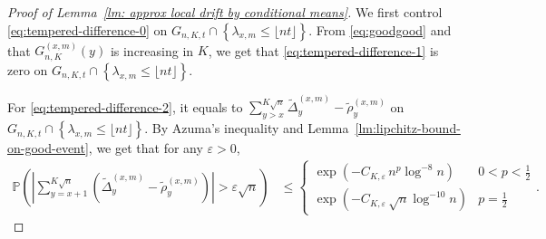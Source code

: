 \documentclass[EJP]{ejpecp} %
\begin{document}
\begin{proof}[Proof of Lemma~\ref{lm: approx local drift by conditional means}]
	We first control \eqref{eq:tempered-difference-0} on $G_{n, K, t} \cap \left\{\lambda_{x,m} \leq\lfloor nt \rfloor \right\}$. From \eqref{eq:goodgood} and that $G_{n,K}^{(x,m)}(y)$ is increasing in $K$, we get that  \eqref{eq:tempered-difference-1} is zero on $G_{n, K, t} \cap \left\{\lambda_{x,m} \leq\lfloor nt \rfloor \right\}$. 
	
	For \eqref{eq:tempered-difference-2}, it equals to
	$
	\sum_{y > x}^{K\sqrt{n}} \tilde \Delta_{y}^{(x,m)} - \tilde\rho_y^{(x,m)}
	$
	on $G_{n, K, t} \cap \left\{\lambda_{x,m} \leq\lfloor nt \rfloor \right\}$. By Azuma's inequality and Lemma~\ref{lm:lipchitz-bound-on-good-event}, we get that for any $\varepsilon>0$,
	\begin{align}
		\mathbb{P}\left( \left| \sum_{y = x + 1}^{K \sqrt{n} } (\tilde\Delta_y^{(x,m)} - \tilde\rho_y^{(x,m)}) \right| > \varepsilon \sqrt{n}  \right) 
		&
		\label{eq:azuma-drift-martingale}
		\le \begin{cases}
			\exp\left( - C_{K, \varepsilon} \, n^{p } \log^{-8} n \right)
			& 0 < p < \frac{1}{2} \\
			\exp\left( - C_{K, \varepsilon} \, \sqrt{n}  \log^{-10} n \right)
			& p = \frac{1}{2}
		\end{cases}
		.\end{align}
	

\end{proof}
\end{document}
